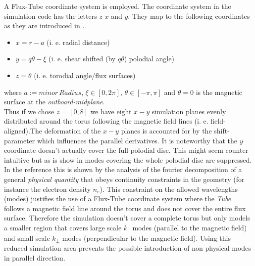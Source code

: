 \documentclass[master.tex]{subfiles}
\begin{document}
A Flux-Tube coordinate system is employed.
The coordinate system in the simulation code has the letters $z$ $x$ and $y$. They map to the following coordinates as they are introduced in \cite{doi:10.1063/1.1335832}.
\begin{itemize}
    \item $x = r - a$   (i. e. radial distance)
    \item $y = q\theta - \xi$ (i. e. shear shifted (by $q\theta$) polodial angle)
    \item $z = \theta$ (i. e. torodial angle/flux surfaces)
\end{itemize} 
where $a:=minor\, Radius$, $\xi \in [0,2\pi]$, $\theta \in [-\pi,\pi]$ and $\theta = 0$ is the magnetic surface at the \textit{outboard-midplane}.\\
Thus if we chose $z=[0,8]$ we have eight $x-y$ simulation planes evenly distributed around the torus following the magnetic field lines (i. e. field-aligned).The deformation of the $x-y$ planes is accounted for by the shift-parameter which influences the parallel derivatives.\newline
It is noteworthy that the $y$ coordinate doesn't actually cover the full polodial disc. This might seem counter intuitive but as is show in \cite{ScottFluxTube} modes covering the whole polodial disc are suppressed. In the reference this is shown by the analysis of the fourier decomposition of a general \textit{physical quantity} that obeys continuity constraints in the geometry (for instance the electron density $n_e$).
This constraint on the allowed wavelengths (modes) justifies the use of a Flux-Tube coordinate system where the \textit{Tube} follows a magnetic field line around the torus and does not cover the entire flux surface. Therefore the simulation doesn't cover a complete torus but only models a smaller region that covers large scale $k_\parallel$ modes (parallel to the magnetic field) and small scale $k_\perp$ modes (perpendicular to the magnetic field). Using this reduced simulation area prevents the possible introduction of non physical modes in parallel direction.
\end{document}
